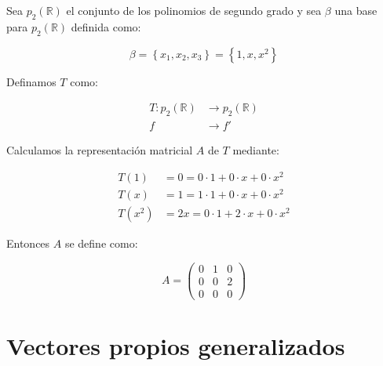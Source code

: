 		\begin{ejemplo}
			Sea $p_2(\mathbb{R})$ el conjunto de los polinomios de segundo grado y sea $\beta$ una base para $p_2(\mathbb{R})$ definida como:

			\begin{equation*}
				\beta = \left\{ x_1, x_2, x_3 \right\} = \left\{ 1, x, x^2 \right\}
			\end{equation*}

			Definamos $T$ como:

			\begin{align*}
				T \colon p_2(\mathbb{R}) &\to p_2(\mathbb{R}) \\
				f &\to f'
			\end{align*}

			Calculamos la representación matricial $A$ de $T$ mediante:

			\begin{align*}
				T(1) &= 0 = 0 \cdot 1 + 0 \cdot x + 0 \cdot x^2 \\
				T(x) &= 1 = 1 \cdot 1 + 0 \cdot x + 0 \cdot x^2 \\
				T(x^2) &= 2x = 0 \cdot 1 + 2 \cdot x + 0 \cdot x^2
			\end{align*}

			Entonces $A$ se define como:

			\begin{equation*}
				A =
				\begin{pmatrix}
					0 & 1 & 0 \\
					0 & 0 & 2 \\
					0 & 0 & 0
				\end{pmatrix}
			\end{equation*}
		\end{ejemplo}

\newpage
\section{Vectores propios generalizados}